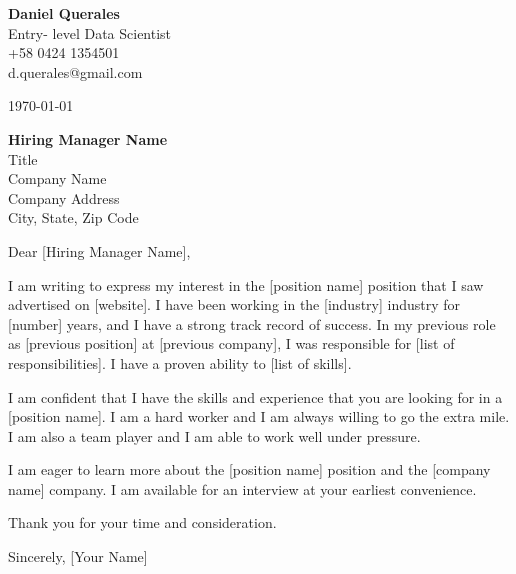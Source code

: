\documentclass{article}
\begin{document}
\thispagestyle{empty}

\begin{center}
{\Huge \textbf{Daniel Querales}} \\
\bigskip
{\Large{Entry- level Data Scientist}} \\
\bigskip
{+58 0424 1354501} \\
{d.querales@gmail.com} \\
\end{center}

\vspace{1em}

\begin{center}
\today
\end{center}

\vspace{1em}

\begin{flushleft}
{\textbf{Hiring Manager Name}} \\
{Title} \\
{Company Name} \\
{Company Address} \\
{ City, State, Zip Code}
\end{flushleft}

\vspace{1em}

Dear [Hiring Manager Name],

\vspace{1em}

I am writing to express my interest in the [position name] position that I saw advertised on [website]. I have been working in the [industry] industry for [number] years, and I have a strong track record of success. In my previous role as [previous position] at [previous company], I was responsible for [list of responsibilities]. I have a proven ability to [list of skills].

\vspace{1em}

I am confident that I have the skills and experience that you are looking for in a [position name]. I am a hard worker and I am always willing to go the extra mile. I am also a team player and I am able to work well under pressure.

\vspace{1em}

I am eager to learn more about the [position name] position and the [company name] company. I am available for an interview at your earliest convenience.

\vspace{1em}

Thank you for your time and consideration.

\vspace{1em}

Sincerely, [Your Name]
\end{document}
